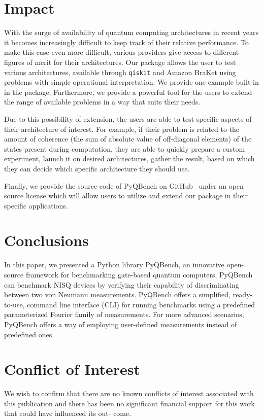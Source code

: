 \documentclass[preprint,12pt, a4paper, dvipsnames]{elsarticle}
\newcommand{\1}{{\rm 1\hspace{-0.9mm}l}}
\theoremstyle{definition}
\begin{document}
\section{Impact}
With the surge of availability of quantum computing architectures in recent years it becomes
increasingly difficult to keep track of their relative performance. To make this case even more
difficult, various providers give access to different figures of merit for their architectures. Our
package allows the user to test various architectures, available through \texttt{qiskit} and Amazon
BraKet using problems with simple operational interpretation. We provide one example built-in in the
package. Furthermore, we provide a powerful tool for the users to extend the range of available
problems in a way that suits their needs.

Due to this possibility of extension, the users are able to test specific aspects of their
architecture of interest. For example, if their problem is related to the amount of coherence (the
sum of absolute value of off-diagonal elements) of the states present during computation, they are
able to quickly prepare a custom experiment, launch it on desired architectures, gather the result,
based on which they can decide which specific architecture they should use.

Finally, we provide the source code of PyQBench on GitHub~\cite{pyqbenchgithub} under an open source
license which will allow users to utilize and extend our package in their specific applications.

\section{Conclusions}
\label{}

In this paper, we presented a Python library PyQBench, an innovative open-source framework for
benchmarking gate-based quantum computers.
PyQBench can benchmark NISQ devices by verifying their capability of discriminating between two von
Neumann measurements. PyQBench offers a simplified, ready-to-use, command line interface (CLI) for
running benchmarks using a predefined parameterized Fourier family of measurements. For more
advanced scenarios, PyQBench offers a way of employing user-defined measurements instead of
predefined ones.

\section{Conflict of Interest}
We wish to confirm that there are no known conflicts of interest associated with this publication
and there has been no significant financial support for this work that could have influenced its
out- come.
\end{document}
